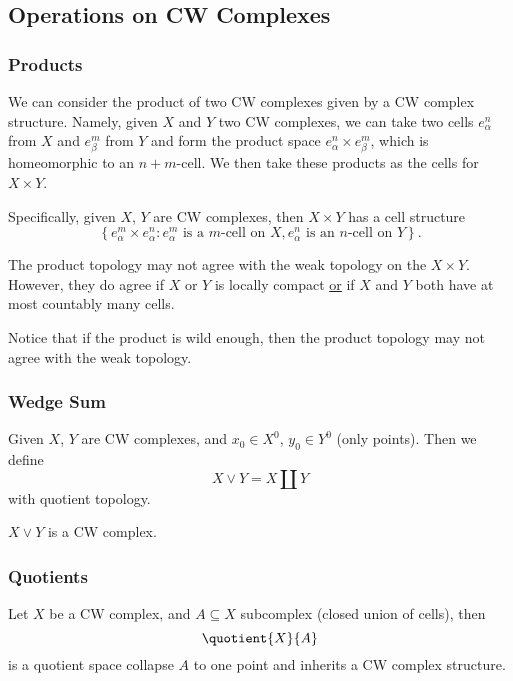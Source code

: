 \subsection{Operations on CW Complexes}
\subsubsection{Products}\label{sssec:Products}
We can consider the product of two CW complexes given by a CW complex structure. Namely, given \(X\) and \(Y\)
two CW complexes, we can take two cells \(e^n_{\alpha }\) from \(X\) and \(e^m_{\beta }\) from \(Y\) and
form the product space \(e^n_{\alpha }\times e^m_{\beta }\), which is homeomorphic to an \(n+m\)-cell. We then
take these products as the cells for \(X\times Y\).

Specifically, given \(X\), \(Y\) are CW complexes, then \(X\times Y\) has a cell structure
\[
	\left\{e_{\alpha}^m \times e_{\alpha}^n\colon e^m_{\alpha}\text{ is a \(m\)-cell on \(X\)}, e^n_{\alpha}\text{ is an \(n\)-cell on \(Y\)}\right\}.
\]
\begin{remark}
	The product topology may not agree with the weak topology on the \(X\times Y\). However, they do agree if
	\(X\) or \(Y\) is locally compact \underline{or} if \(X\) and \(Y\) both have at most countably many cells.
\end{remark}

\begin{note}
	Notice that if the product is wild enough, then the product topology may not agree with the weak topology.
\end{note}
\subsubsection{Wedge Sum}\label{sssec:Wedge-sum}
Given \(X\), \(Y\) are CW complexes, and \(x_0\in X^0\), \(y_0\in Y^0\) (only points). Then we define
\[
	X\vee Y = X\coprod Y
\]
with quotient topology.
\begin{remark}
	\(X\lor Y\) is a CW complex.
\end{remark}

\subsubsection{Quotients}\label{sssec:Quotients}
Let \(X\) be a CW complex, and \(A\subseteq X\) subcomplex (closed union of cells), then
\[
	\quotient{X}{A}
\]
is a quotient space collapse \(A\) to one point and inherits a CW complex structure.

